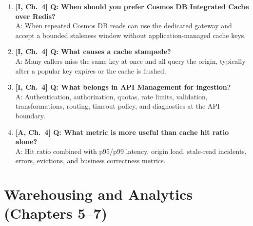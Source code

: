 \begin{enumerate}
    A: It is optimized for in-memory speed; durable databases should own authoritative state unless the Redis tier and design explicitly meet durability requirements.
    \item \textbf{[I, Ch.~4] Q: When should you prefer Cosmos DB Integrated Cache over Redis?}\\
    A: When repeated Cosmos DB reads can use the dedicated gateway and accept a bounded staleness window without application-managed cache keys.
    \item \textbf{[I, Ch.~4] Q: What causes a cache stampede?}\\
    A: Many callers miss the same key at once and all query the origin, typically after a popular key expires or the cache is flushed.
    \item \textbf{[I, Ch.~4] Q: What belongs in API Management for ingestion?}\\
    A: Authentication, authorization, quotas, rate limits, validation, transformations, routing, timeout policy, and diagnostics at the API boundary.
    \item \textbf{[A, Ch.~4] Q: What metric is more useful than cache hit ratio alone?}\\
    A: Hit ratio combined with p95/p99 latency, origin load, stale-read incidents, errors, evictions, and business correctness metrics.
\end{enumerate}

\section{Warehousing and Analytics (Chapters 5--7)}

